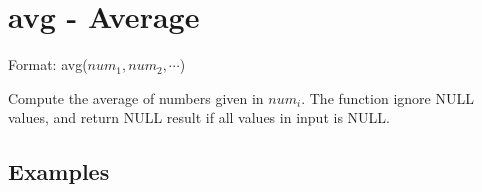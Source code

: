
%

\section{avg - Average\label{sect:avg}}

Format: avg($num_1,num_2,\cdots$)

Compute the average of numbers given in $num_i$. The function ignore NULL values, and return NULL result if all values in input is NULL. 


\subsection*{Examples}


%

